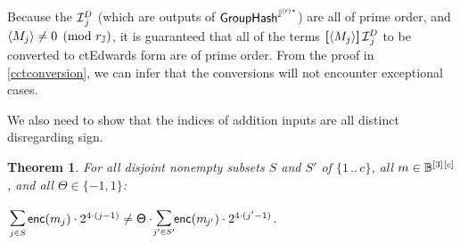 \documentclass{article}
\newtheorem{theorem}{Theorem}[subsection]
\newcommand{\crossref}[1]{\autoref{#1}}
\newcommand{\bit}{\mathbb{B}}
\newcommand{\typeexp}[2]{{#1}\vphantom{)}^{[{#2}]}}
\newcommand{\bitseq}[1]{\typeexp{\bit}{#1}}
\newcommand{\setof}[1]{\{{#1}\}}
\newcommand{\barerange}[2]{{{#1}\,..\,{#2}}}
\newcommand{\range}[2]{\setof{\barerange{#1}{#2}}}
\newcommand{\vop}[3]{\,\raisebox{0.29ex}{\scalebox{0.89}{$\smashoperator[r]{#3_{#1}^{#2}}$\,}}}
\newcommand{\vsum}[2]{\vop{#1}{#2}{\sum}}
\newcommand{\mult}{\cdot}
\newcommand{\scalarmult}[2]{\boldsymbol{[}{#1}\boldsymbol{]}\,{#2}}
\newcommand{\enc}{\mathsf{enc}}
\newcommand{\subgroupr}{(\kern-0.075emr\kern-0.075em)}
\newcommand{\GroupHash}{\mathsf{GroupHash}}
\newcommand{\ParamJ}[1]{{{#1}_\mathbb{\hskip 0.01em J}}}
\newcommand{\GroupJ}{\mathbb{J}}
\newcommand{\SubgroupJstar}{\GroupJ^{\subgroupr\ast}}
\newcommand{\GroupJHash}[1]{\GroupHash^{\SubgroupJstar}_{#1}}
\newcommand{\PedersenGenAlg}{\mathcal{I}}
\newcommand{\PedersenGen}[2]{\PedersenGenAlg^{\kern -0.05em{#1}}_{\kern 0.1em {#2}}}
\newcommand{\PedersenEncode}[1]{\langle{#1}\rangle}
\newcommand{\Sign}{\mathsf{\Theta}}
\begin{document}
Because the $\PedersenGen{D}{j}$ (which are outputs of $\GroupJHash{}$)
are all of prime order, and $\PedersenEncode{M_j} \neq 0 \pmod{\ParamJ{r}}$,
it is guaranteed that all of the terms
$\scalarmult{\PedersenEncode{M_j}}{\PedersenGen{D}{j}}$
to be converted to ctEdwards form are of prime order.
From the proof in \crossref{cctconversion}, we can infer that
the conversions will not encounter exceptional cases.

We also need to show that the indices of addition inputs are
all distinct disregarding sign.

\begin{theorem}

For all disjoint nonempty subsets $S$ and $S'$ of $\range{1}{c}$, all
$m \in \typeexp{\bitseq{3}}{c}$, and all $\Sign \in \setof{-1, 1}$:

\begin{formulae}
  \item $\vsum{j \in S\vphantom{S'}}{} \enc(m_j) \mult 2^{4 \mult (j-1)} \neq
         \Sign \mult\!\!\vsum{j' \in S'}{} \enc(m_{\kern -0.1em j'}) \mult 2^{4 \mult (j'-1)}$.
\end{formulae}
\end{theorem}
\end{document}

